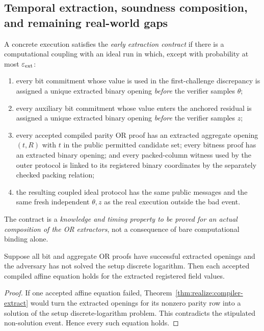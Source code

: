 \subsection{Temporal extraction, soundness composition, and remaining real-world gaps}\label{sec:realize:security}

\begin{definition}\label{def:realize:early-extract}
A concrete execution satisfies the
\emph{early extraction contract} if there is a
computational coupling with an ideal run
in which, except with probability at most
$\varepsilon_{\rm ext}$:
\begin{enumerate}[label=\textup{(\roman*)}]
\item every bit commitment whose value is
used in the first-challenge discrepancy is
assigned a unique extracted binary opening
\emph{before} the verifier samples $\theta$;
\item every auxiliary bit commitment whose value
enters the anchored residual is assigned a
unique extracted binary opening
\emph{before} the verifier samples $z$;
\item every accepted compiled parity OR proof
has an extracted aggregate opening
$(t,R)$ with $t$ in the public
permitted candidate set; every
bitness proof has an extracted binary
opening; and every packed-column witness
used by the outer protocol is linked
to its registered binary coordinates
by the separately checked packing relation;
\item the resulting coupled ideal protocol
has the same public messages and the same
fresh independent $\theta,z$ as the
real execution outside the bad event.
\end{enumerate}
The contract is a \emph{knowledge and
timing property to be proved for an actual
composition of the OR extractors},
not a consequence of bare computational
binding alone.
\end{definition}

\begin{lemma}\label{lem:realize:extracted-correct}
Suppose all bit and aggregate OR proofs have
successful extracted openings and the adversary
has not solved the setup discrete logarithm.
Then each accepted compiled affine equation
holds for the extracted registered field values.
\end{lemma}
\begin{proof}
If one accepted affine equation failed,
Theorem~\ref{thm:realize:compiler-extract}
would turn the extracted openings for its
nonzero parity row into a solution of the
setup discrete-logarithm problem.
This contradicts the stipulated
non-solution event. Hence every such
equation holds.
\end{proof}

